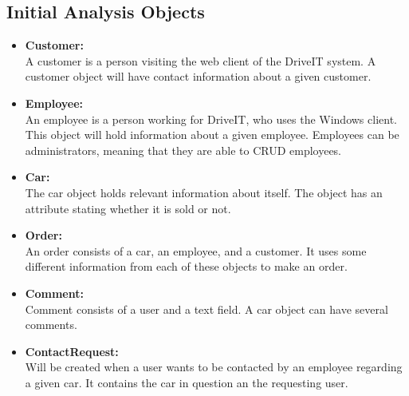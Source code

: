 \subsection{Initial Analysis Objects}
\begin{itemize}
    \item \textbf{Customer:}\\
    A customer is a person visiting the web client of the DriveIT system. A customer object will have contact information about a given customer.
    \item \textbf{Employee:}\\
    An employee is a person working for DriveIT, who uses the Windows client. This object will hold information about a given employee. Employees can be administrators, meaning that they are able to CRUD employees.
    \item \textbf{Car:}\\
    The car object holds relevant information about itself. The object has an attribute stating whether it is sold or not.
    \item \textbf{Order:}\\
    An order consists of a car, an employee, and a customer. It uses some different information from each of these objects to make an order.
    \item \textbf{Comment:}\\
    Comment consists of a user and a text field. A car object can have several comments.
    \item \textbf{ContactRequest:}\\
    Will be created when a user wants to be contacted by an employee regarding a given car. It contains the car in question an the requesting user.
\end{itemize}
